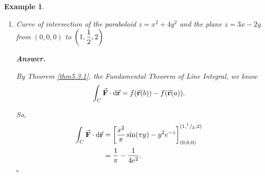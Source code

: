 \documentclass[12pt,a4paper]{article}
\newtheorem{eg}{Example}[subsection]
\newenvironment*{ans}{\par\indent\textbf{\textit{Answer. }}\par}{\par\hfill{$\square$}\par}
\def\dsst{\displaystyle}
\def\d{{\mathrm{d}}}
\def\intC{\dsst\int_C}
\def\vecr{\va{{\textbf{r}}}}
\def\F{\va{\boldsymbol{\textbf{F}}}}
\begin{document}
\begin{eg}
\begin{enumerate}
\begin{enumerate}
\begin{ans}
		\end{ans}
		\item Curve of intersection of the paraboloid $z=x^2+4y^2$ and the plane $z=3x-2y$ from $(0,0,0)$ to $\qty(1,\dfrac{1}{2},2)$
		\begin{ans}
			By Theorem \ref{thm5.3.1}, the Fundamental Theorem of Line Integral, we know \[\intC\F\cdot\d\vecr=f(\vecr(b))-f(\vecr(a)).\]\par So, \[\begin{aligned}\intC\F\cdot\d\vecr&=\qty[\dfrac{x^2}{\pi}\sin(\pi y)-y^2e^{-z}]_{(0,0,0)}^{(1,^1/_2,2)}\\&=\dfrac{1}{\pi}-\dfrac{1}{4e^2}.\end{aligned}\]
		\end{ans}
	\end{enumerate}
\end{enumerate}	
\end{eg}
\end{document}
